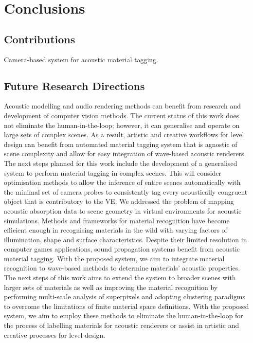\section{Conclusions}

\subsection{Contributions}
Camera-based system for acoustic material tagging.

\subsection{Future Research Directions}
Acoustic modelling and audio rendering methods can benefit from research and development of computer vision methods. 
The current status of this work does not eliminate the human-in-the-loop; however, it can generalise and operate on large sets of complex scenes. As a result, artistic and creative workflows for level design can benefit from automated material tagging system that is agnostic of scene complexity and allow for easy integration of wave-based acoustic renderers.
The next steps planned for this work include the development of a generalised system to perform material tagging in complex scenes. This will consider optimisation methods to allow the inference of entire scenes automatically with the minimal set of camera probes to consistently tag every acoustically congruent object that is contributory to the VE. 
We addressed the problem of mapping acoustic absorption data to scene geometry in virtual environments for acoustic simulations. Methods and frameworks for material recognition have become efficient enough in recognising materials in the wild with varying factors of illumination, shape and surface characteristics. Despite their limited resolution in computer games applications, sound propagation systems benefit from acoustic material tagging. With the proposed system, we aim to integrate material recognition to wave-based methods to determine materials' acoustic properties.
The next steps of this work aims to extend the system to broader scenes with larger sets of materials as well as improving the material recognition by performing multi-scale analysis of superpixels and adopting clustering paradigms to overcome the limitations of finite material space definitions.
With the proposed system, we aim to employ these methods to eliminate the human-in-the-loop for the process of labelling materials for acoustic renderers or assist in artistic and creative processes for level design. 

